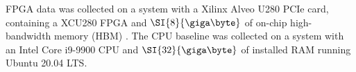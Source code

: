 
FPGA data was collected on a system with a Xilinx Alveo U280 PCIe card,
containing a XCU280 FPGA and $\SI{8}{\giga\byte}$ of on-chip high-bandwidth
memory (HBM) \autocite{u280}. The CPU baseline was collected on a system with an
Intel Core i9-9900 CPU and $\SI{32}{\giga\byte}$ of installed RAM running Ubuntu
20.04 LTS.










